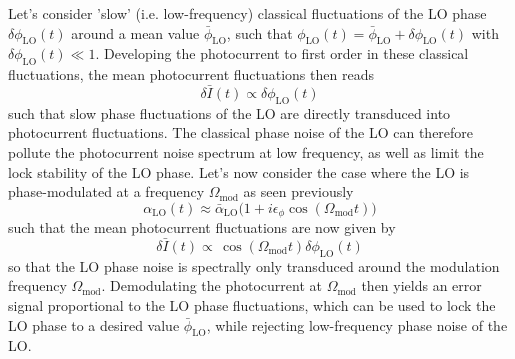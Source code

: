 Let's consider 'slow' (i.e. low-frequency) classical fluctuations of the LO phase $\delta \phi_{\mathrm{LO}}(t)$ around a mean value $\bar \phi_{\mathrm{LO}}$, such that $\phi_{\mathrm{LO}}(t) = \bar \phi_{\mathrm{LO}} + \delta \phi_{\mathrm{LO}}(t)$ with $\delta \phi_{\mathrm{LO}}(t) \ll 1$. Developing the photocurrent to first order in these classical fluctuations, the mean photocurrent fluctuations then reads 
\begin{equation}
    \delta \bar I(t) \propto \delta \phi_{\mathrm{LO}}(t) 
\end{equation}
such that slow phase fluctuations of the LO are directly transduced into photocurrent fluctuations. The classical phase noise of the LO can therefore pollute the photocurrent noise spectrum at low frequency, as well as limit the lock stability of the LO phase. Let's now consider the case where the LO is phase-modulated at a frequency $\Omega_{\mathrm{mod}}$ as seen previously 
\begin{equation*}
  \alpha_{\mathrm{LO}}(t) \approx \bar{\alpha}_{\mathrm{LO}} \Big( 1 + i \epsilon_{\phi} \cos(\Omega_{\mathrm{mod}} t) \Big)
\end{equation*}
such that the mean photocurrent fluctuations are now given by
\begin{equation}
    \delta \bar I(t) \propto \, \cos(\Omega_{\mathrm{mod}} t) \delta \phi_{\mathrm{LO}}(t)
\end{equation}
so that the LO phase noise is spectrally only transduced around the modulation frequency $\Omega_{\mathrm{mod}}$. Demodulating the photocurrent at $\Omega_{\mathrm{mod}}$ then yields an error signal proportional to the LO phase fluctuations, which can be used to lock the LO phase to a desired value $\bar \phi_{\mathrm{LO}}$, while rejecting low-frequency phase noise of the LO. \\ 

